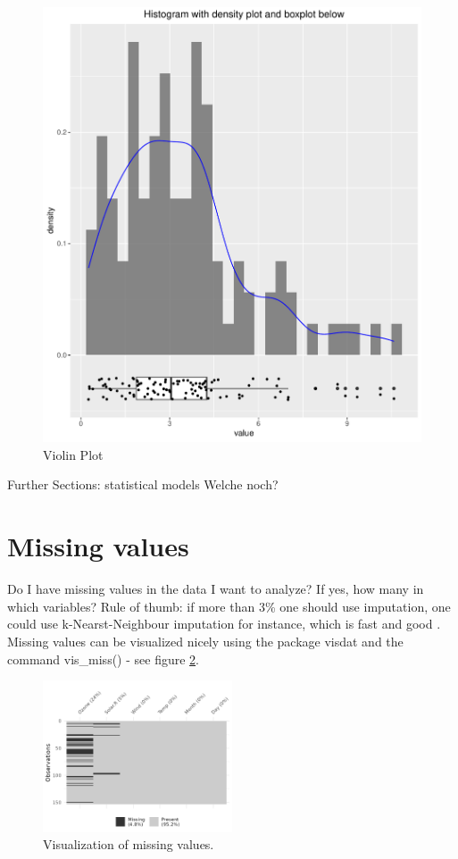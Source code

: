 \documentclass[12pt,a4paper]{article}
\begin{document}
\begin{figure}[htbp]
\begin{minipage}[b]{0.45\textwidth}
    \includegraphics[width=\textwidth]{./images/density_plot_with_boxplot.pdf}
    \caption{Violin Plot}
    \label{densityplot}
  \end{minipage}
\end{figure}

Further Sections: statistical models
Welche noch?

\section{Missing values}
Do I have missing values in the data I want to analyze? If yes, how many in which variables?
Rule of thumb: if more than 3\% one should use imputation, one could use k-Nearst-Neighbour imputation for instance, which is fast and good \cite{VIM}.
Missing values can be visualized nicely using the package visdat \cite{visdat} and the command vis\_miss() - see figure \ref{fig:vismiss}. 

\begin{figure}[h!]
  \centering
  \includegraphics[width=0.5\textwidth]{./images/vis_miss.png}
  \caption{Visualization of missing values.}
  \label{fig:vismiss}
\end{figure}
\end{document}
